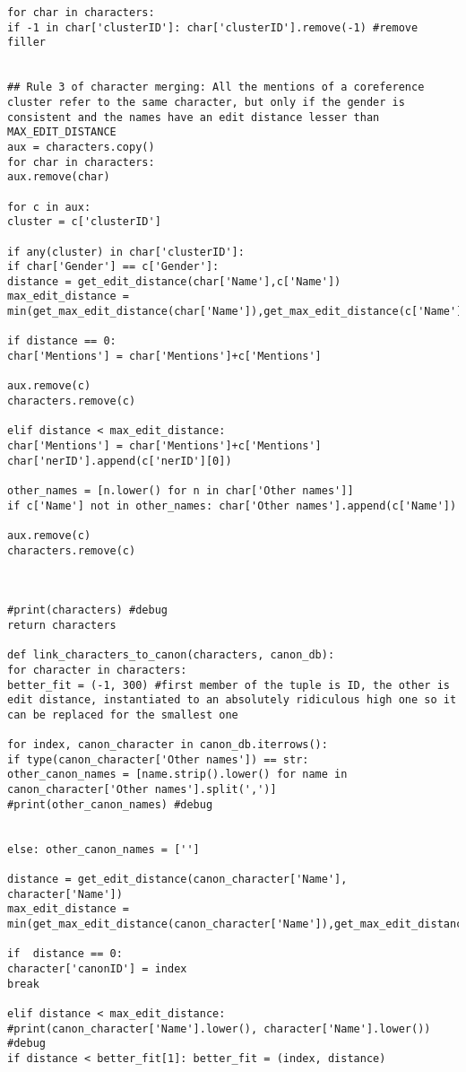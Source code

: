 \documentclass{pre-tfg}
\begin{document}
\begin{lstlisting}[style=consola]
for char in characters:
if -1 in char['clusterID']: char['clusterID'].remove(-1) #remove filler


## Rule 3 of character merging: All the mentions of a coreference cluster refer to the same character, but only if the gender is consistent and the names have an edit distance lesser than MAX_EDIT_DISTANCE
aux = characters.copy()
for char in characters:
aux.remove(char)

for c in aux:
cluster = c['clusterID']

if any(cluster) in char['clusterID']:
if char['Gender'] == c['Gender']:
distance = get_edit_distance(char['Name'],c['Name'])
max_edit_distance = min(get_max_edit_distance(char['Name']),get_max_edit_distance(c['Name']))

if distance == 0:
char['Mentions'] = char['Mentions']+c['Mentions']

aux.remove(c)
characters.remove(c)

elif distance < max_edit_distance:
char['Mentions'] = char['Mentions']+c['Mentions']
char['nerID'].append(c['nerID'][0])

other_names = [n.lower() for n in char['Other names']]
if c['Name'] not in other_names: char['Other names'].append(c['Name'])

aux.remove(c)
characters.remove(c)



#print(characters) #debug
return characters

def link_characters_to_canon(characters, canon_db):
for character in characters:
better_fit = (-1, 300) #first member of the tuple is ID, the other is edit distance, instantiated to an absolutely ridiculous high one so it can be replaced for the smallest one

for index, canon_character in canon_db.iterrows():
if type(canon_character['Other names']) == str:
other_canon_names = [name.strip().lower() for name in canon_character['Other names'].split(',')]
#print(other_canon_names) #debug


else: other_canon_names = ['']

distance = get_edit_distance(canon_character['Name'], character['Name'])
max_edit_distance = min(get_max_edit_distance(canon_character['Name']),get_max_edit_distance(character['Name']))

if  distance == 0:
character['canonID'] = index
break

elif distance < max_edit_distance:
#print(canon_character['Name'].lower(), character['Name'].lower()) #debug
if distance < better_fit[1]: better_fit = (index, distance)


\end{lstlisting}
\end{document}
